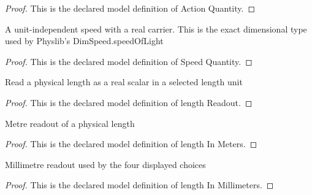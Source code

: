 \begin{proof}
  This is the declared model definition of Action Quantity.
\end{proof}
\begin{definition}
  \label{def:physics:phyx-mini-0628:phyxminiproblems-problemphyxmini0628-speedquantity}
  A unit-independent speed with a real carrier. This is the exact dimensional type used by Physlib's DimSpeed.speedOfLight
\end{definition}
\begin{proof}
  This is the declared model definition of Speed Quantity.
\end{proof}
\begin{definition}
  \label{def:physics:phyx-mini-0628:phyxminiproblems-problemphyxmini0628-lengthreadout}
  Read a physical length as a real scalar in a selected length unit
\end{definition}
\begin{proof}
  This is the declared model definition of length Readout.
\end{proof}
\begin{definition}
  \label{def:physics:phyx-mini-0628:phyxminiproblems-problemphyxmini0628-lengthinmeters}
  Metre readout of a physical length
\end{definition}
\begin{proof}
  This is the declared model definition of length In Meters.
\end{proof}
\begin{definition}
  \label{def:physics:phyx-mini-0628:phyxminiproblems-problemphyxmini0628-lengthinmillimeters}
  Millimetre readout used by the four displayed choices
\end{definition}
\begin{proof}
  This is the declared model definition of length In Millimeters.
\end{proof}
